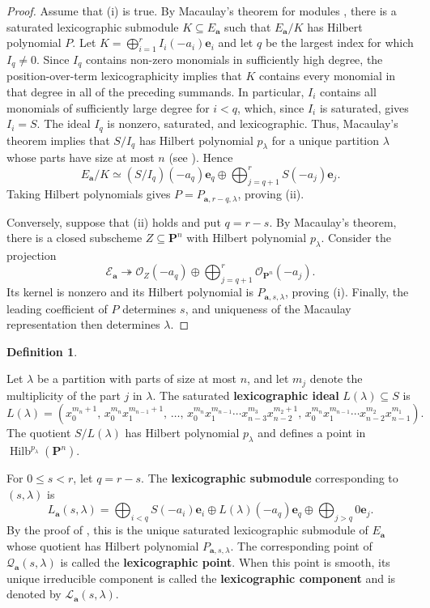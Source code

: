 \documentclass[leqno,11pt,a4paper]{amsart}
\theoremstyle{definition}
\newtheorem{definition}[definition]{Definition}
\numberwithin{equation}{section}
\newcommand{\bfa}{\mathbf{a}}
\newcommand{\PP}{\mathbf{P}}
\newcommand{\bfe}{\mathbf{e}}
\newcommand{\EE}{\mathscr{E}}
\newcommand{\OO}{\mathscr{O}}
\newcommand{\LL}{\mathcal{L}}
\newcommand{\QQ}{\mathcal{Q}}
\DeclareMathOperator{\Hilb}{Hilb}
\begin{document}
\begin{proof}
Assume that (i) is true.
By Macaulay's theorem for modules \cite[Proposition 2]{Pardue}, there is a saturated lexicographic submodule $K\subseteq E_{\bfa}$ such that $E_{\bfa}/K$ has Hilbert polynomial $P$.
Let $K=\bigoplus_{i=1}^r I_i(-a_i)\bfe_i$ and let $q$ be the largest index for which $I_q\neq0$.
Since $I_q$ contains non-zero monomials in sufficiently high degree, the position-over-term lexicographicity implies that $K$ contains every monomial in that degree in all of the preceding summands.
In particular, $I_i$ contains all monomials of sufficiently large degree for $i<q$, which, since $I_i$ is saturated, gives $I_i=S$.
The ideal $I_q$ is nonzero, saturated, and lexicographic. 
Thus, Macaulay's theorem implies that $S/I_q$ has Hilbert polynomial $p_\lambda$ for a unique partition $\lambda$ whose parts have size at most $n$ (see \cite{SS23}). 
Hence
$$
E_{\bfa}/K \simeq (S/I_q)(-a_q)\bfe_q \oplus \bigoplus_{j=q+1}^r S(-a_j)\bfe_j.
$$
Taking Hilbert polynomials gives $P=P_{\bfa,r-q,\lambda}$, proving (ii).

Conversely, suppose that (ii) holds and put $q=r-s$.
By Macaulay's theorem, there is a closed subscheme $Z \subseteq \PP^n$ with Hilbert polynomial $p_\lambda$.
Consider the projection
$$
\EE_{\bfa}\twoheadrightarrow \OO_Z(-a_q)\oplus \bigoplus_{j=q+1}^r\OO_{\PP^n}(-a_j).
$$
Its kernel is nonzero and its Hilbert polynomial
is $P_{\bfa,s,\lambda}$, proving (i).
Finally, the leading coefficient of $P$ determines $s$, and uniqueness of the Macaulay representation then determines $\lambda$.
\end{proof}

\begin{definition} \label{lexmodule}

Let $\lambda$ be a partition with parts of size at most $n$, and let $m_j$ denote the multiplicity of the part $j$ in $\lambda$.
The saturated \textbf{lexicographic ideal} $L(\lambda)\subseteq S$ is
$$
L(\lambda)=\left(
x_0^{m_n+1},\,
x_0^{m_n}x_1^{m_{n-1}+1},\, \ldots,\,
x_0^{m_n}x_1^{m_{n-1}} \cdots
x_{n-3}^{m_3}x_{n-2}^{m_2+1},\,
x_0^{m_n}x_1^{m_{n-1}} \cdots x_{n-2}^{m_2}x_{n-1}^{m_1}
\right).
$$
The quotient $S/L(\lambda)$ has Hilbert polynomial $p_\lambda$ and defines a point in $\Hilb^{p_\lambda}(\PP^n)$.



For $0\leq s<r$, let $q=r-s$. The \textbf{lexicographic submodule} corresponding to $(s,\lambda)$ is
$$
L_{\bfa}(s,\lambda) = \bigoplus_{i<q}S(-a_i)\bfe_i \oplus L(\lambda)(-a_q)\bfe_q \oplus\bigoplus_{j>q}0\bfe_j.
$$
By the proof of , this is the unique saturated lexicographic submodule of $E_{\bfa}$
whose quotient has Hilbert polynomial $P_{\bfa,s,\lambda}$.
The corresponding point of $\QQ_{\bfa}(s,\lambda)$ is called the \textbf{lexicographic point}.
When this point is smooth, its unique irreducible component is called the \textbf{lexicographic component} and is denoted by $\LL_{\bfa}(s,\lambda)$.
\end{definition}
\end{document}
